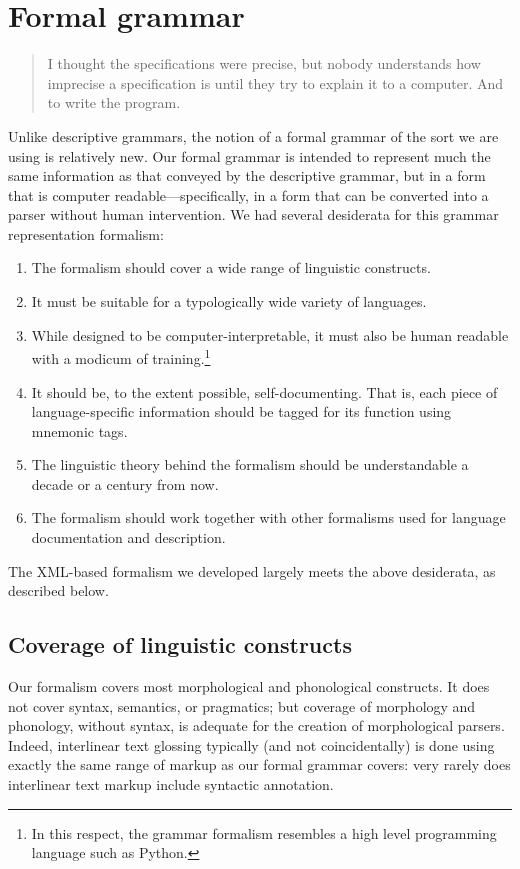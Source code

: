 \section{Formal grammar}
\begin{quote}
 I thought the specifications were precise, but nobody understands how imprecise a specification is until they try to explain it to a computer. And to write the program. \citep[608]{Knuth1996}
\end{quote}

Unlike descriptive grammars, the notion of a formal grammar of the sort we are using is relatively new. Our formal grammar is intended to represent much the same information as that conveyed by the descriptive grammar, but in a form that is computer readable---specifically, in a form that can be converted into a parser without human intervention. We had several desiderata for this grammar representation formalism:

\begin{enumerate}
\item The formalism should cover a wide range of linguistic constructs.
\item It must be suitable for a typologically wide variety of languages.
\item While designed to be computer-interpretable, it must also be human readable with a modicum of training.\footnote{In
  this respect, the grammar formalism resembles a high level programming language such as Python.
}
\item It should be, to the extent possible, self-documenting. That is, each piece of language-specific information should be tagged for its function using mnemonic tags.
\item The linguistic theory behind the formalism should be understandable a decade or a century from now.
\item The formalism should work together with other formalisms used for language documentation and description. 
\end{enumerate}

The XML-based formalism we developed largely meets the above desiderata, as described below.

\subsection{Coverage of linguistic constructs}
Our formalism covers most morphological and phonological constructs. It does not cover syntax, semantics, or pragmatics; but coverage of morphology and phonology, without syntax, is adequate for the creation of morphological parsers. Indeed, interlinear text glossing typically (and not coincidentally) is done using exactly the same range of markup as our formal grammar covers: very rarely does interlinear text markup include syntactic annotation. 


